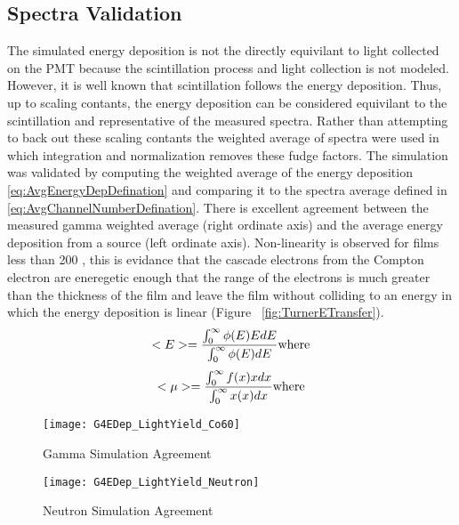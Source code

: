 \subsection{Spectra Validation}
The simulated energy deposition is not the directly equivilant to light collected on the PMT because the scintillation process and light collection is not modeled.
However, it is well known that scintillation follows the energy deposition\cite{birks_scintillations_1951}.
Thus, up to scaling contants, the energy deposition can be considered equivilant to the scintillation and representative of the measured spectra.
Rather than attempting to back out these scaling contants the weighted average of spectra were used in which integration and normalization removes these fudge factors.
The simulation was validated by computing the weighted average of the energy deposition \ref{eq:AvgEnergyDepDefination} and comparing it to the spectra average defined in \ref{eq:AvgChannelNumberDefination}.
There is excellent agreement between the measured gamma weighted average (right ordinate axis) and the average energy deposition from a  source (left ordinate axis).
Non-linearity is observed for films less than 200 \micron, this is evidance that the cascade electrons from the Compton electron are eneregetic enough that the range of the electrons is much greater than the thickness of the film and leave the film without colliding to an energy in which the energy deposition is linear (Figure ~\ref{fig:TurnerETransfer}).
\begin{equation}
\label{eq:AvgEnergyDepDefination}
<E> = \frac{\int_0^\infty {\phi(E)EdE}}{\int_0^\infty{\phi(E)dE}} \\
\text{where}
\end{equation}
\begin{equation}
\label{eq:AvgChannelNumberDefination}
<\mu> = \frac{\int_0^\infty {f(x)xdx}}{\int_0^\infty{x(x)dx}} \\
\text{where}
\end{equation}
\begin{figure}
    \centering
    \caption{Gamma Simulation Agreement}
    \texttt{[image: G4EDep\_LightYield\_Co60]}
    \label{fig:GammaSimAgreement}
\end{figure}
\begin{figure}
    \centering
    \caption{Neutron Simulation Agreement}
    \texttt{[image: G4EDep\_LightYield\_Neutron]}
    \label{fig:NeutronSimAgreement}
\end{figure}


